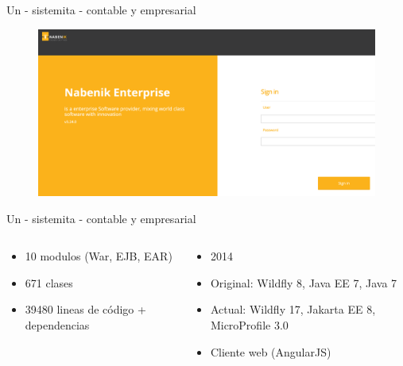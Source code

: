 \documentclass[aspectratio=169]{beamer}
\begin{document}
\begin{frame}[fragile]{Un - sistemita - contable y empresarial}

    \begin{figure}
        \centering
        \includegraphics[width=\linewidth]{Images/erp}
    \end{figure}
\end{frame}


\begin{frame}[fragile]{Un - sistemita - contable y empresarial}
\begin{columns}[T] %

    \begin{column}[T]{5cm} %
       \begin{itemize}
               \item 10 modulos (War, EJB, EAR)
               \item 671 clases
               \item 39480 lineas de código + dependencias
       \end{itemize}
    \end{column}
    \begin{column}[T]{6cm} %
        \begin{itemize}
        \item 2014
           \item Original: Wildfly 8, Java EE 7, Java 7
           \item Actual: Wildfly 17, Jakarta EE 8, MicroProfile 3.0
           \item Cliente web (AngularJS)
       \end{itemize}
    \end{column}
\end{columns}
\end{frame}
\end{document}
